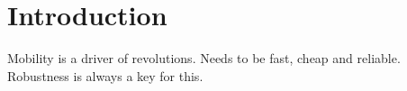 
\chapter{Introduction}
Mobility is a driver of revolutions. Needs to be fast, cheap and reliable. Robustness is always a key for this.
